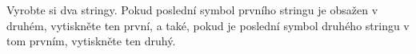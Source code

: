 \question[30]
Vyrobte si dva stringy. Pokud poslední symbol prvního stringu je obsažen v
druhém, vytiskněte ten první, a také, pokud je poslední symbol druhého
stringu v tom prvním, vytiskněte ten druhý.